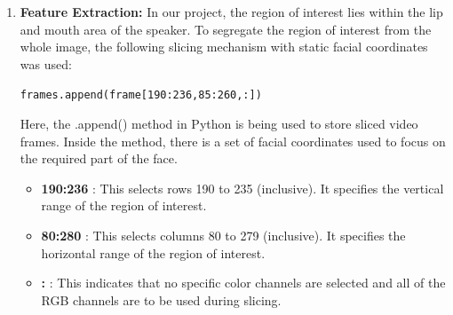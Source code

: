\begin{enumerate}
\item \textbf{\large Feature Extraction:}
In our project, the region of interest lies within the lip and mouth area of the speaker. To segregate the region of interest from the whole image, the following slicing mechanism with static facial coordinates was used:
\begin{center}
    \texttt{frames.append(frame[190:236,85:260,:])}
\end{center}
 Here, the .append() method in Python is being used to store sliced video frames. Inside the method, there is a set of facial coordinates used to focus on the required part of the face.
 \begin{itemize}
     \item \textbf{190:236} : This selects rows 190 to 235 (inclusive). It specifies the vertical range of the region of interest.
     \item \textbf{80:280} : This selects columns 80 to 279 (inclusive). It specifies the horizontal range of the region of interest.
     \item \textbf{\large:} : This indicates that no specific color channels are selected and all of the RGB channels are to be used during slicing.
 \end{itemize}

 \begin{figure}
  \centering


\end{figure}
\end{enumerate}
